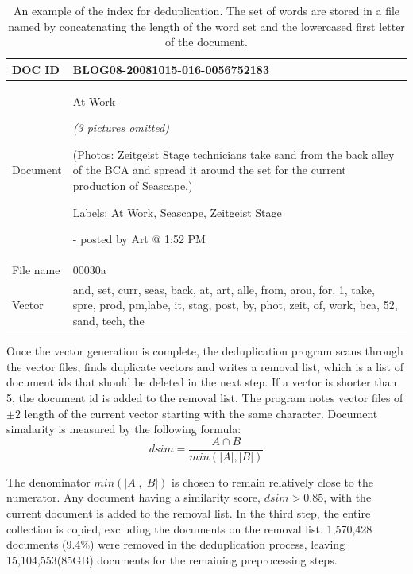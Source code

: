 \documentclass{sig-alternate}
\begin{document}
\begin{table}[h!t!]
\begin{center}
\begin{tabular}{l|p{6.0cm}}

\hline
DOC ID & BLOG08-20081015-016-0056752183\\ 

\hline
Document & 

At Work


\emph{(3 pictures omitted)}



(Photos: Zeitgeist Stage technicians take sand from the back alley of the BCA and spread it around the set for the current production of Seascape.)

Labels: At Work, Seascape, Zeitgeist Stage


- posted by Art @ 1:52 PM\\
\hline
File name& 00030a\\
\hline
Vector & and, set, curr, seas, back, at, art, alle, from, arou, for, 1, take, spre, prod, pm,labe, it, stag, post, by, phot, zeit, of, work, bca, 52, sand, tech, the\\

\hline
\end{tabular}
\caption{An example of the index for deduplication. The set of words are stored in a file named by concatenating the length of the word set and the lowercased first letter of the document.}
\label{table:dedup}
\end{center}
\end{table}

Once the vector generation is complete, the deduplication program scans through the vector files, finds duplicate vectors and writes a removal list, which is a list of document ids that should be deleted in the next step. If a vector is shorter than 5, the document id is added to the removal list. The program notes vector files of $\pm 2$ length of the current vector starting with the same character. Document simalarity is measured by the following formula:
\begin{displaymath}
dsim=\frac{A \cap B}  {min(|A|, |B|)}
\end{displaymath}

The denominator $min(|A|, |B|)$ is chosen to remain relatively close to the numerator. Any document having a similarity score, $dsim > 0.85$, with the current document is added to the removal list. In the third step, the entire collection is copied, excluding the documents on the removal list. 1,570,428 documents (9.4\%) were removed in the deduplication process, leaving 15,104,553(85GB) documents for the remaining preprocessing steps.
\end{document}
